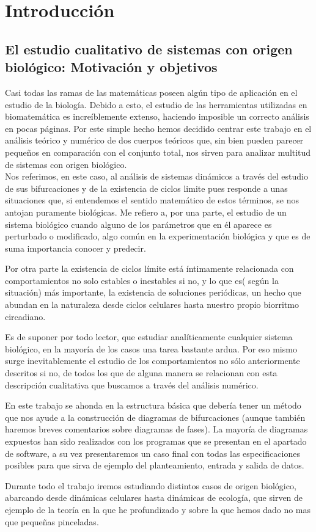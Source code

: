 
\chapter{Introducción}


\label{ch:Introducción}

\section{El estudio cualitativo de sistemas con origen biológico: Motivación y objetivos}
Casi todas las ramas de las matemáticas poseen algún tipo de aplicación en el estudio de la biología. Debido a esto, el estudio de las herramientas utilizadas en biomatemática es increíblemente extenso, haciendo imposible un correcto análisis en pocas páginas. Por este simple hecho hemos decidido centrar este trabajo en el análisis teórico y numérico de dos cuerpos teóricos que, sin bien pueden parecer pequeños en comparación con el conjunto total, nos sirven para analizar multitud de sistemas con origen biológico.\\ 

Nos referimos, en este caso, al análisis de sistemas dinámicos a través del estudio de sus bifurcaciones y de la existencia de ciclos limite pues responde a unas situaciones que, si entendemos el sentido matemático de estos términos, se nos antojan puramente biológicas. Me refiero a, por una parte, el estudio de un sistema  biológico cuando alguno de los parámetros que en él aparece es perturbado o modificado, algo común en la experimentación biológica y que es de suma importancia conocer y predecir. 

Por otra parte la existencia de ciclos límite está íntimamente relacionada con comportamientos no solo estables o inestables si no, y lo que es( según la situación) más importante, la existencia de soluciones periódicas, un hecho que abundan en la naturaleza desde ciclos celulares hasta nuestro propio biorritmo circadiano.


Es de suponer por todo lector, que estudiar analíticamente cualquier sistema biológico, en la mayoría de los casos una tarea bastante ardua. Por eso mismo surge inevitablemente el estudio de los comportamientos no sólo anteriormente descritos si no, de todos los que de alguna manera se relacionan con esta descripción cualitativa que buscamos a través del análisis numérico.

 En este trabajo se ahonda en la estructura básica que debería tener un método que nos ayude a la construcción de diagramas de bifurcaciones (aunque también haremos breves comentarios sobre diagramas de fases). La mayoría de diagramas expuestos han sido realizados con los programas que se presentan en el apartado de software, a su vez presentaremos un caso final con todas las especificaciones posibles para que sirva de ejemplo del planteamiento, entrada y salida de datos.
 
 
Durante todo el trabajo iremos estudiando distintos casos de origen biológico, abarcando desde dinámicas celulares hasta dinámicas de ecología, que sirven de ejemplo de la teoría en la que he profundizado y sobre la que hemos dado no mas que pequeñas pinceladas.